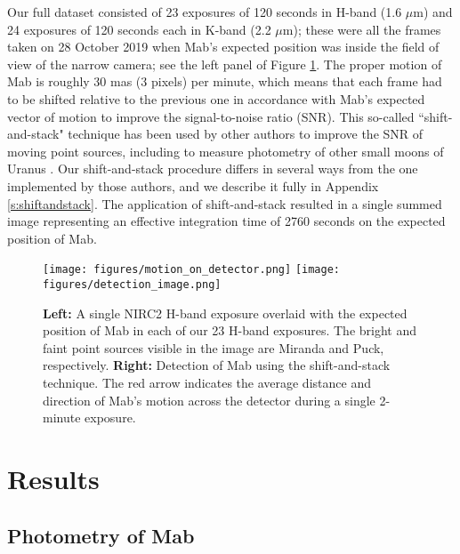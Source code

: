 \documentclass[preprint]{aastex631}
\begin{document}
Our full dataset consisted of 23 exposures of 120 seconds in H-band (1.6 $\mu$m) and 24 exposures of 120 seconds each in K-band (2.2 $\mu$m); these were all the frames taken on 28 October 2019 when Mab's expected position was inside the field of view of the narrow camera; see the left panel of Figure \ref{fig:detection}.
The proper motion of Mab is roughly 30 mas (3 pixels) per minute, which means that each frame had to be shifted relative to the previous one in accordance with Mab's expected vector of motion to improve the signal-to-noise ratio (SNR). This so-called ``shift-and-stack" technique has been used by other authors to improve the SNR of moving point sources, including to measure photometry of other small moons of Uranus \citep[][]{paradis19, paradis23}. Our shift-and-stack procedure differs in several ways from the one implemented by those authors, and we describe it fully in Appendix \ref{s:shiftandstack}. The application of shift-and-stack resulted in a single summed image representing an effective integration time of 2760 seconds on the expected position of Mab. 

\begin{figure}
\texttt{[image: figures/motion\_on\_detector.png]}
\texttt{[image: figures/detection\_image.png]}
\caption{\textbf{Left:} A single NIRC2 H-band exposure overlaid with the expected position of Mab in each of our 23 H-band exposures. The bright and faint point sources visible in the image are Miranda and Puck, respectively. \textbf{Right:} Detection of Mab using the shift-and-stack technique. The red arrow indicates the average distance and direction of Mab's motion across the detector during a single 2-minute exposure.\label{fig:detection}}
\end{figure}

\section{Results}
\label{s:results}

\subsection{Photometry of Mab}
\end{document}
